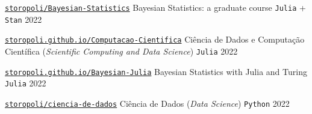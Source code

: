

\begin{cventries}

	\cventry
	{\href{https://github.com/storopoli/Bayesian-Statistics}{\texttt{storopoli/Bayesian-Statistics}}} %
	{Bayesian Statistics: a graduate course} %
	{\texttt{Julia} + \texttt{Stan}} %
	{2022} %

	\cventry
	{\href{https://storopoli.github.io/Computacao-Cientifica/}{\texttt{storopoli.github.io/Computacao-Cientifica}}} %
	{Ciência de Dados e Computação Científica (\textit{Scientific Computing and Data Science})} %
	{\texttt{Julia}} %
	{2022} %

	\cventry
	{\href{https://storopoli.github.io/Bayesian-Julia/}{\texttt{storopoli.github.io/Bayesian-Julia}}} %
	{Bayesian Statistics with Julia and Turing} %
	{\texttt{Julia}} %
	{2022} %

	\cventry
	{\href{https://github.com/storopoli/ciencia-de-dados}{\texttt{storopoli/ciencia-de-dados}}} %
	{Ciência de Dados (\textit{Data Science})} %
	{\texttt{Python}} %
	{2022} %

\end{cventries}
